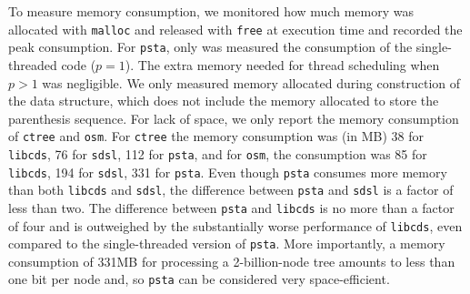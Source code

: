%
To measure memory consumption, we monitored how much memory was allocated with
\texttt{malloc} and released with \texttt{free} at execution time and
recorded the peak consumption. For {\tt psta}, only was measured the consumption of
the single-threaded code ($p = 1$). The extra memory needed
for thread scheduling when $p > 1$ was negligible. We only measured memory allocated
during construction of the data structure, which does not include the
memory allocated to store the parenthesis sequence. For lack of space, we only
report the memory consumption of {\tt ctree} and {\tt osm}. For {\tt ctree}
the memory consumption was (in MB) 38 for {\tt libcds}, 76 for {\tt sdsl}, 112 for {\tt psta},
and for {\tt osm}, the consumption was 85 for {\tt libcds}, 194 for {\tt sdsl}, 331 for {\tt psta}.
Even though {\tt psta} consumes more memory than both {\tt libcds} and {\tt sdsl},
the difference between {\tt psta} and {\tt sdsl} is a factor of less
than two. The difference between {\tt psta} and {\tt libcds} is no
more than a factor of four and is outweighed by the substantially
worse performance of {\tt libcds}, even compared to the
single-threaded version of {\tt psta}.  More importantly, a memory
consumption of 331MB for processing a 2-billion-node tree amounts to
less than one bit per node and, so {\tt psta} can be considered very
space-efficient.

